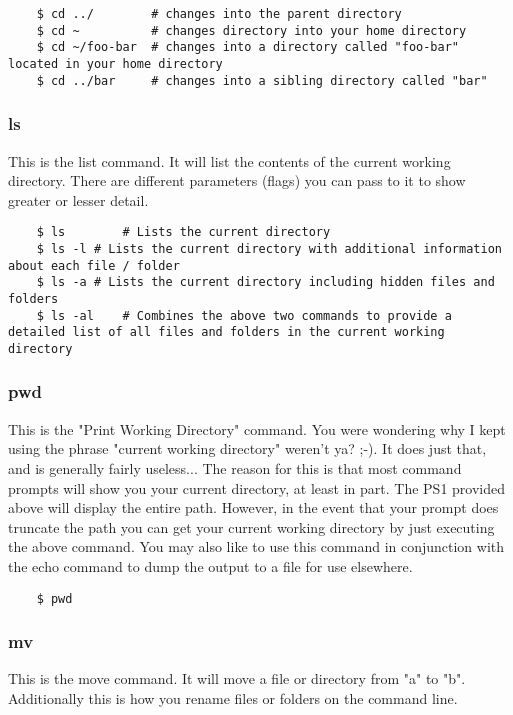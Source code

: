 	\begin{verbatim}
	$ cd ../		# changes into the parent directory
	$ cd ~			# changes directory into your home directory
	$ cd ~/foo-bar	# changes into a directory called "foo-bar" located in your home directory
	$ cd ../bar		# changes into a sibling directory called "bar"
	\end{verbatim}

\subsubsection{ls} \mdseries
This is the list command.  It will list the contents of the current working directory.  There are different parameters (flags) you can pass to it to show greater or lesser detail.
	
	\begin{verbatim}
	$ ls		# Lists the current directory
	$ ls -l	# Lists the current directory with additional information about each file / folder
	$ ls -a	# Lists the current directory including hidden files and folders
	$ ls -al	# Combines the above two commands to provide a detailed list of all files and folders in the current working directory
	\end{verbatim}

\subsubsection{pwd} \mdseries
This is the "Print Working Directory" command.  You were wondering why I kept using the phrase "current working directory" weren't ya? ;-).  It does just that, and is generally fairly useless...  The reason for this is that most command prompts will show you your current directory, at least in part.  The PS1 provided above will display the entire path.  However, in the event that your prompt does truncate the path you can get your current working directory by just executing the above command.  You may also like to use this command in conjunction with the echo command to dump the output to a file for use elsewhere.

	\begin{verbatim}
	$ pwd
	\end{verbatim}
	

\subsubsection{mv} \mdseries
This is the move command.  It will move a file or directory from "a" to "b".  Additionally this is how you rename files or folders on the command line.

